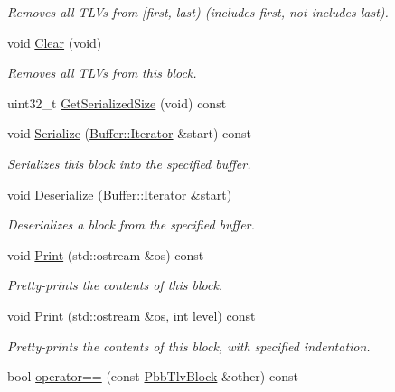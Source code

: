 \begin{DoxyCompactItemize}
\begin{DoxyCompactList}\small\item\em Removes all T\+L\+Vs from \mbox{[}first, last) (includes first, not includes last). \end{DoxyCompactList}\item 
void \hyperlink{classns3_1_1PbbTlvBlock_a1b1afdc788fab87d517c3edc1c55a9e5}{Clear} (void)
\begin{DoxyCompactList}\small\item\em Removes all T\+L\+Vs from this block. \end{DoxyCompactList}\item 
uint32\+\_\+t \hyperlink{classns3_1_1PbbTlvBlock_a426ac1e1a330131dff7ce11d7651766d}{Get\+Serialized\+Size} (void) const 
\item 
void \hyperlink{classns3_1_1PbbTlvBlock_a1c825abcdf9a3526efbf4b35218ab85b}{Serialize} (\hyperlink{classns3_1_1Buffer_1_1Iterator}{Buffer\+::\+Iterator} \&start) const 
\begin{DoxyCompactList}\small\item\em Serializes this block into the specified buffer. \end{DoxyCompactList}\item 
void \hyperlink{classns3_1_1PbbTlvBlock_acbc87f2a174253635e76f28bed9e1070}{Deserialize} (\hyperlink{classns3_1_1Buffer_1_1Iterator}{Buffer\+::\+Iterator} \&start)
\begin{DoxyCompactList}\small\item\em Deserializes a block from the specified buffer. \end{DoxyCompactList}\item 
void \hyperlink{classns3_1_1PbbTlvBlock_a29137642b33bb79aea6e1d38e7362404}{Print} (std\+::ostream \&os) const 
\begin{DoxyCompactList}\small\item\em Pretty-\/prints the contents of this block. \end{DoxyCompactList}\item 
void \hyperlink{classns3_1_1PbbTlvBlock_a1bcb41b79d2368cf25a25ebce341b0c7}{Print} (std\+::ostream \&os, int level) const 
\begin{DoxyCompactList}\small\item\em Pretty-\/prints the contents of this block, with specified indentation. \end{DoxyCompactList}\item 
bool \hyperlink{classns3_1_1PbbTlvBlock_acced16d85646869a32f20884f8a0fd53}{operator==} (const \hyperlink{classns3_1_1PbbTlvBlock}{Pbb\+Tlv\+Block} \&other) const 

\end{DoxyCompactItemize}
